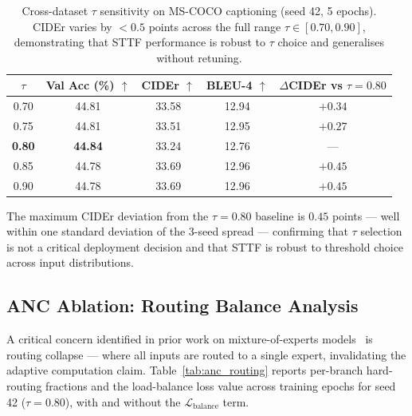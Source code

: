 \documentclass{article}
\begin{document}
\begin{table}[htbp]
\centering
\caption{Cross-dataset $\tau$ sensitivity on MS-COCO captioning (seed 42, 5 epochs). CIDEr varies by $<0.5$ points across the full range $\tau \in [0.70, 0.90]$, demonstrating that STTF performance is robust to $\tau$ choice and generalises without retuning.}
\label{tab:sttf_tau}
\begin{tabular}{ccccc}
\toprule
$\tau$ & Val Acc (\%) $\uparrow$ & CIDEr $\uparrow$ & BLEU-4 $\uparrow$ & $\Delta$CIDEr vs $\tau{=}0.80$ \\
\midrule
0.70 & 44.81 & 33.58 & 12.94 & $+0.34$ \\
0.75 & 44.81 & 33.51 & 12.95 & $+0.27$ \\
\textbf{0.80} & \textbf{44.84} & 33.24 & 12.76 & --- \\
0.85 & 44.78 & 33.69 & 12.96 & $+0.45$ \\
0.90 & 44.78 & 33.69 & 12.96 & $+0.45$ \\
\bottomrule
\end{tabular}
\end{table}

The maximum CIDEr deviation from the $\tau{=}0.80$ baseline is $0.45$ points --- well within one standard deviation of the 3-seed spread --- confirming that $\tau$ selection is not a critical deployment decision and that STTF is robust to threshold choice across input distributions.



\subsection{ANC Ablation: Routing Balance Analysis}

A critical concern identified in prior work on mixture-of-experts models~\cite{fedus2022switch} is routing collapse --- where all inputs are routed to a single expert, invalidating the adaptive computation claim.
Table~\ref{tab:anc_routing} reports per-branch hard-routing fractions and the load-balance loss value across training epochs for seed 42 ($\tau{=}0.80$), with and without the $\mathcal{L}_{\text{balance}}$ term.
\end{document}
